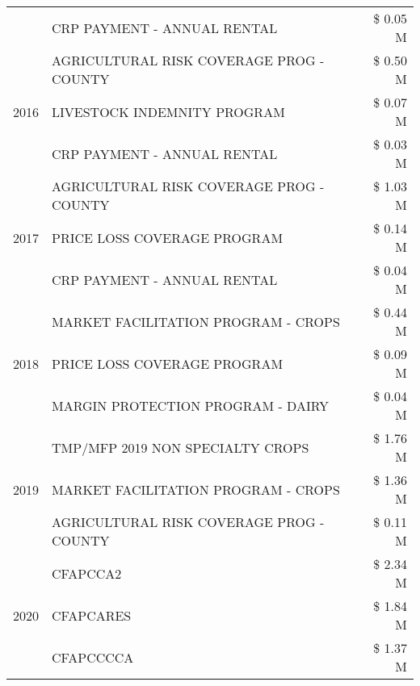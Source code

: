 \begin{tabular}{llr}
 & CRP PAYMENT - ANNUAL RENTAL & \$ 0.05 M \\
\cline{1-3}
\multirow[t]{3}{*}{2016} & AGRICULTURAL RISK COVERAGE PROG - COUNTY & \$ 0.50 M \\
 & LIVESTOCK INDEMNITY PROGRAM & \$ 0.07 M \\
 & CRP PAYMENT - ANNUAL RENTAL & \$ 0.03 M \\
\cline{1-3}
\multirow[t]{3}{*}{2017} & AGRICULTURAL RISK COVERAGE PROG - COUNTY & \$ 1.03 M \\
 & PRICE LOSS COVERAGE PROGRAM & \$ 0.14 M \\
 & CRP PAYMENT - ANNUAL RENTAL & \$ 0.04 M \\
\cline{1-3}
\multirow[t]{3}{*}{2018} & MARKET FACILITATION PROGRAM - CROPS & \$ 0.44 M \\
 & PRICE LOSS COVERAGE PROGRAM & \$ 0.09 M \\
 & MARGIN PROTECTION PROGRAM - DAIRY & \$ 0.04 M \\
\cline{1-3}
\multirow[t]{3}{*}{2019} & TMP/MFP 2019 NON SPECIALTY CROPS & \$ 1.76 M \\
 & MARKET FACILITATION PROGRAM - CROPS & \$ 1.36 M \\
 & AGRICULTURAL RISK COVERAGE PROG - COUNTY & \$ 0.11 M \\
\cline{1-3}
\multirow[t]{3}{*}{2020} & CFAPCCA2 & \$ 2.34 M \\
 & CFAPCARES & \$ 1.84 M \\
 & CFAPCCCCA & \$ 1.37 M \\
\cline{1-3}
\bottomrule
\end{tabular}
